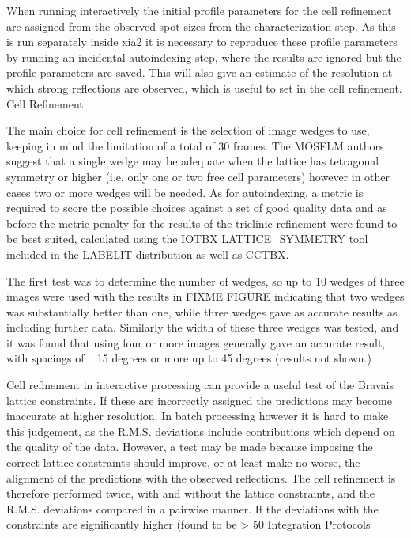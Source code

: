 When running interactively the initial profile parameters for the cell refinement are assigned from the observed spot sizes from the characterization step. As this is run separately inside xia2 it is necessary to reproduce these profile parameters by running an incidental autoindexing step, where the results are ignored but the profile parameters are saved. This will also give an estimate of the resolution at which strong reflections are observed, which is useful to set in the cell refinement.
Cell Refinement

The main choice for cell refinement is the selection of image wedges to use, keeping in mind the limitation of a total of 30 frames. The MOSFLM authors suggest that a single wedge may be adequate when the lattice has tetragonal symmetry or higher (i.e. only one or two free cell parameters) however in other cases two or more wedges will be needed. As for autoindexing, a metric is required to score the possible choices against a set of good quality data and as before the metric penalty for the results of the triclinic refinement were found to be best suited, calculated using the IOTBX LATTICE_SYMMETRY tool included in the LABELIT distribution as well as CCTBX. 

The first test was to determine the number of wedges, so up to 10 wedges of three images were used with the results in FIXME FIGURE indicating that two wedges was substantially better than one, while three wedges gave as accurate results as including further data. Similarly the width of these three wedges was tested, and it was found that using four or more images generally gave an accurate result, with spacings of ~ 15 degrees or more up to 45 degrees (results not shown.) 

Cell refinement in interactive processing can provide a useful test of the Bravais lattice constraints. If these are incorrectly assigned the predictions may become inaccurate at higher resolution. In batch processing however it is hard to make this judgement, as the R.M.S. deviations include contributions which depend on the quality of the data. However, a test may be made because imposing the correct lattice constraints should improve, or at least make no worse, the alignment of the predictions with the observed reflections. The cell refinement is therefore performed twice, with and without the lattice constraints, and the R.M.S. deviations compared in a pairwise manner. If the deviations with the constraints are significantly higher (found to be > 50%
Integration Protocols

